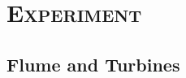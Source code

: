 \documentclass[xcolor=x11names,compress]{beamer}
\begin{document}
\section{\scshape Experiment}

	\subsection{Flume and Turbines}
\end{document}
